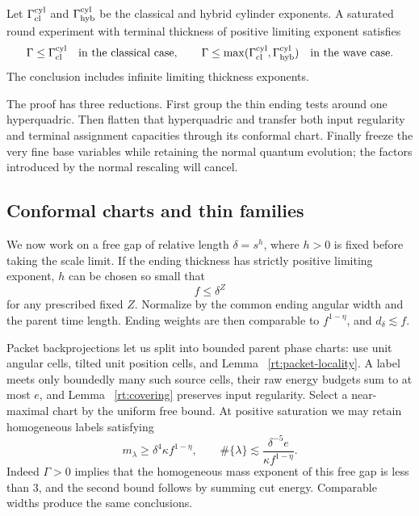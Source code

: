\begin{proposition}\label{rt:thin-exclusion}
Let $\Gamma_{\rm cl}^{\rm cyl}$ and $\Gamma_{\rm hyb}^{\rm cyl}$
be the classical and hybrid cylinder exponents.  A saturated round
experiment with terminal thickness of positive limiting exponent
satisfies
\[
 \Gamma\le\Gamma_{\rm cl}^{\rm cyl}
 \quad\hbox{in the classical case},\qquad
 \Gamma\le\max(\Gamma_{\rm cl}^{\rm cyl},\Gamma_{\rm hyb}^{\rm cyl})
 \quad\hbox{in the wave case}.
\]
The conclusion includes infinite limiting thickness exponents.
\end{proposition}

The proof has three reductions.  First group the thin ending tests around
one hyperquadric.  Then flatten that hyperquadric and transfer both input
regularity and terminal assignment capacities through its conformal chart.
Finally freeze the very fine base variables while retaining the normal
quantum evolution; the factors introduced by the normal rescaling will
cancel.

\subsection{Conformal charts and thin families}

We now work on a free gap of relative length $\delta=s^h$, where $h>0$
is fixed before taking the scale limit.  If the ending thickness has
strictly positive limiting exponent, $h$ can be chosen so small that
\begin{equation}\label{rt:very-thin}
 f\le\delta^Z
\end{equation}
for any prescribed fixed $Z$.  Normalize by the common ending angular
width and the parent time length.  Ending weights are then comparable
to $f^{1-\eta}$, and $d_\delta\lesssim f$.

Packet backprojections let us split into bounded parent phase charts:
use unit angular cells, tilted unit position cells, and Lemma~
\ref{rt:packet-locality}.  A label meets only boundedly many such source
cells, their raw energy budgets sum to at most $e$, and Lemma~
\ref{rt:covering} preserves input regularity.  Select a near-maximal
chart by the uniform free bound.  At positive saturation we may retain
homogeneous labels satisfying
\begin{equation}\label{rt:heavy-labels}
 m_\lambda\ge\delta^4\kappa f^{1-\eta},\qquad
 \#\{\lambda\}\lesssim
 \frac{\delta^{-5}e}{\kappa f^{1-\eta}}.
\end{equation}
Indeed $\Gamma>0$ implies that the homogeneous mass exponent of this
free gap is less than $3$, and the second bound follows by summing
cut energy.  Comparable widths produce the same conclusions.

